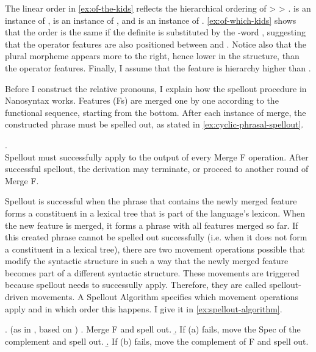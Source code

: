 The linear order in \ref{ex:of-the-kids} reflects the hierarchical ordering of  >  > .  is an instance of ,  is an instance of , and  is an instance of .
\ref{ex:of-which-kids} shows that the order is the same if the definite is substituted by the -word , suggesting that the operator features are also positioned between  and .
Notice also that the plural morpheme  appears more to the right, hence lower in the structure, than the operator features.
Finally, I assume that the feature  is hierarchy higher than .

Before I construct the relative pronouns, I explain how the spellout procedure in Nanosyntax works. Features (Fs) are merged one by one according to the functional sequence, starting from the bottom. After each instance of merge, the constructed phrase must be spelled out, as stated in \ref{ex:cyclic-phrasal-spellout}.

\ex.  \citep{caha2021}\\
Spellout must successfully apply to the output of every Merge F operation. After successful spellout, the derivation may terminate, or proceed to another round of Merge F.\label{ex:cyclic-phrasal-spellout}

Spellout is successful when the phrase that contains the newly merged feature forms a constituent in a lexical tree that is part of the language's lexicon.
When the new feature is merged, it forms a phrase with all features merged so far.
If this created phrase cannot be spelled out successfully (i.e. when it does not form a constituent in a lexical tree), there are two movement operations possible that modify the syntactic structure in such a way that the newly merged feature becomes part of a different syntactic structure.
These movements are triggered because spellout needs to successully apply. Therefore, they are called spellout-driven movements.
A Spellout Algorithm specifies which movement operations apply and in which order this happens. I give it in \ref{ex:spellout-algorithm}.

\ex.  (as in \citealt{caha2021}, based on \citealt{starke2018})\label{ex:spellout-algorithm}
 \a. Merge F and spell out.\label{ex:spellout-algorithm-phrasal}
 \b. If (a) fails, move the Spec of the complement and spell out.\label{ex:spellout-algorithm-spec}
 \b. If (b) fails, move the complement of F and spell out.\label{ex:spellout-algorithm-comp}

